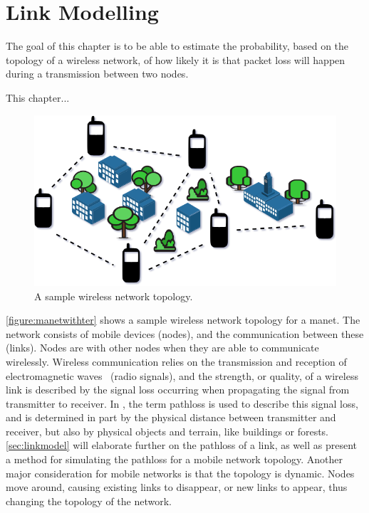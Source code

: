 \chapter{Link Modelling}\label{ch:linkmodel}
The goal of this chapter is to be able to estimate the probability, based on the topology of a wireless network, of how likely it is that packet loss will happen during a transmission between two nodes.

This chapter...\medbreak

\begin{figure}[ht]
    \centering
    \includegraphics[width=.7\textwidth]{figures/manet_with_terrain.png}
    \caption{A sample wireless network topology.}
    \label{figure:manetwithter}
\end{figure}

\autoref{figure:manetwithter} shows a sample wireless network topology for a \acrfull{manet}. The network consists of mobile devices (nodes), and the communication between these (links). Nodes are  with other nodes when they are able to communicate wirelessly. Wireless communication relies on the transmission and reception of electromagnetic waves~\cite[p.~10]{paper:linkmodel} (radio signals), and the strength, or quality, of a wireless link is described by the signal loss occurring when propagating the signal from transmitter to receiver. In \cite{paper:linkmodel}, the term \gls{pathloss} is used to describe this signal loss, and is determined in part by the physical distance between transmitter and receiver, but also by physical objects and terrain, like buildings or forests. \autoref{sec:linkmodel} will elaborate further on the \gls{pathloss} of a link, as well as present a method for simulating the \gls{pathloss} for a mobile network topology. Another major consideration for mobile networks is that the topology is dynamic. Nodes move around, causing existing links to disappear, or new links to appear, thus changing the topology of the network.


